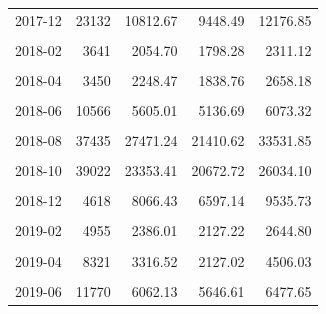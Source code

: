 \begin{longtable}[t]{crrrr}
2017-12 & 23132 & 10812.67 & 9448.49 & 12176.85\\
\cellcolor{gray!10}{2018-01} & \cellcolor{gray!10}{3627} & \cellcolor{gray!10}{2920.08} & \cellcolor{gray!10}{2541.17} & \cellcolor{gray!10}{3299.00}\\
2018-02 & 3641 & 2054.70 & 1798.28 & 2311.12\\
\cellcolor{gray!10}{2018-03} & \cellcolor{gray!10}{5152} & \cellcolor{gray!10}{2616.13} & \cellcolor{gray!10}{2344.27} & \cellcolor{gray!10}{2887.99}\\
2018-04 & 3450 & 2248.47 & 1838.76 & 2658.18\\
\cellcolor{gray!10}{2018-05} & \cellcolor{gray!10}{5960} & \cellcolor{gray!10}{3298.68} & \cellcolor{gray!10}{2978.31} & \cellcolor{gray!10}{3619.05}\\
2018-06 & 10566 & 5605.01 & 5136.69 & 6073.32\\
\cellcolor{gray!10}{2018-07} & \cellcolor{gray!10}{20243} & \cellcolor{gray!10}{13330.82} & \cellcolor{gray!10}{11205.05} & \cellcolor{gray!10}{15456.59}\\
2018-08 & 37435 & 27471.24 & 21410.62 & 33531.85\\
\cellcolor{gray!10}{2018-09} & \cellcolor{gray!10}{73180} & \cellcolor{gray!10}{39282.00} & \cellcolor{gray!10}{36105.08} & \cellcolor{gray!10}{42458.93}\\
2018-10 & 39022 & 23353.41 & 20672.72 & 26034.10\\
\cellcolor{gray!10}{2018-11} & \cellcolor{gray!10}{18423} & \cellcolor{gray!10}{15648.40} & \cellcolor{gray!10}{14020.03} & \cellcolor{gray!10}{17276.78}\\
2018-12 & 4618 & 8066.43 & 6597.14 & 9535.73\\
\cellcolor{gray!10}{2019-01} & \cellcolor{gray!10}{4129} & \cellcolor{gray!10}{3013.92} & \cellcolor{gray!10}{2647.43} & \cellcolor{gray!10}{3380.40}\\
2019-02 & 4955 & 2386.01 & 2127.22 & 2644.80\\
\cellcolor{gray!10}{2019-03} & \cellcolor{gray!10}{21414} & \cellcolor{gray!10}{5684.74} & \cellcolor{gray!10}{4946.70} & \cellcolor{gray!10}{6422.78}\\
2019-04 & 8321 & 3316.52 & 2127.02 & 4506.03\\
\cellcolor{gray!10}{2019-05} & \cellcolor{gray!10}{5228} & \cellcolor{gray!10}{2960.91} & \cellcolor{gray!10}{2599.30} & \cellcolor{gray!10}{3322.53}\\
2019-06 & 11770 & 6062.13 & 5646.61 & 6477.65\\

\end{longtable}
